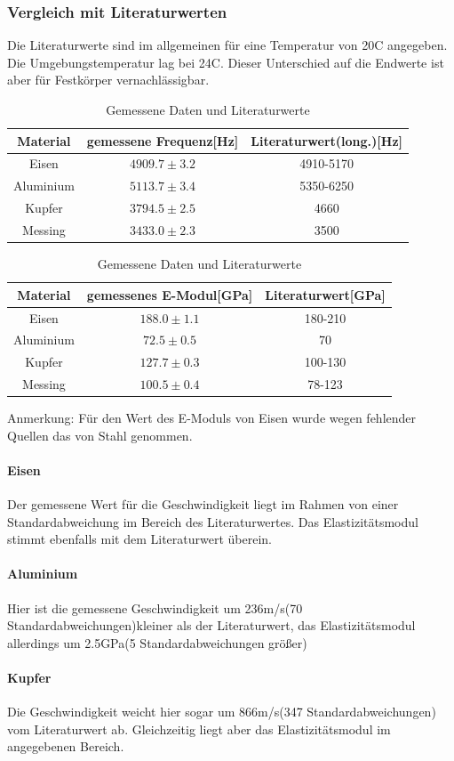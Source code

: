 \documentclass[12pt,a4paper]{article}
\begin{document}
\subsubsection{Vergleich mit Literaturwerten}
Die Literaturwerte sind im allgemeinen für eine Temperatur von 20C angegeben. Die Umgebungstemperatur lag bei 24C. Dieser Unterschied auf die Endwerte ist aber für Festkörper vernachlässigbar.
\begin{table}
\begin{tabular}{|c|c|c|}
\hline 
Material & gemessene Frequenz[Hz] & Literaturwert(long.)[Hz] \\ 
\hline 
Eisen & $4909.7\pm3.2$ & 4910-5170  \\ 
\hline 
Aluminium & $5113.7\pm3.4$ & 5350-6250  \\ 
\hline 
Kupfer & $3794.5\pm2.5$ & 4660 \\ 
\hline 
Messing & $3433.0\pm2.3$ & 3500 \\ 
\hline 
\end{tabular} 
\begin{tabular}{|c|c|c|}
\hline 
Material & gemessenes E-Modul[GPa] & Literaturwert[GPa] \\ 
\hline 
Eisen & $188.0\pm1.1$ & 180-210 \\ 
\hline 
Aluminium & $72.5\pm0.5$ & 70 \\ 
\hline 
Kupfer & $127.7\pm0.3$ & 100-130 \\ 
\hline 
Messing & $100.5\pm0.4$ & 78-123 \\ 
\hline 
\end{tabular} 
\caption{Gemessene Daten und Literaturwerte}
Anmerkung: Für den Wert des E-Moduls von Eisen wurde wegen fehlender Quellen das von Stahl genommen.
\end{table}
\paragraph{Eisen}
Der gemessene Wert für die Geschwindigkeit liegt im Rahmen von einer Standardabweichung im Bereich des Literaturwertes.
Das Elastizitätsmodul stimmt ebenfalls mit dem Literaturwert überein.
\paragraph{Aluminium}
Hier ist die gemessene Geschwindigkeit um 236m/s(70 Standardabweichungen)kleiner als der Literaturwert, das Elastizitätsmodul allerdings um 2.5GPa(5 Standardabweichungen größer)
\paragraph{Kupfer}
Die Geschwindigkeit weicht hier sogar um 866m/s(347 Standardabweichungen) vom Literaturwert ab. Gleichzeitig liegt aber das Elastizitätsmodul im angegebenen Bereich.
\end{document}
